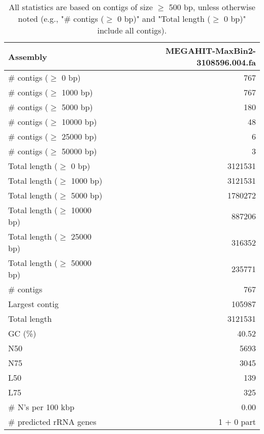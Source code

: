 \documentclass[12pt,a4paper]{article}
\begin{document}
\begin{table}[ht]
\begin{center}
\caption{All statistics are based on contigs of size $\geq$ 500 bp, unless otherwise noted (e.g., "\# contigs ($\geq$ 0 bp)" and "Total length ($\geq$ 0 bp)" include all contigs).}
\begin{tabular}{|l*{1}{|r}|}
\hline
Assembly & MEGAHIT-MaxBin2-3108596.004.fa \\ \hline
\# contigs ($\geq$ 0 bp) & 767 \\ \hline
\# contigs ($\geq$ 1000 bp) & 767 \\ \hline
\# contigs ($\geq$ 5000 bp) & 180 \\ \hline
\# contigs ($\geq$ 10000 bp) & 48 \\ \hline
\# contigs ($\geq$ 25000 bp) & 6 \\ \hline
\# contigs ($\geq$ 50000 bp) & 3 \\ \hline
Total length ($\geq$ 0 bp) & 3121531 \\ \hline
Total length ($\geq$ 1000 bp) & 3121531 \\ \hline
Total length ($\geq$ 5000 bp) & 1780272 \\ \hline
Total length ($\geq$ 10000 bp) & 887206 \\ \hline
Total length ($\geq$ 25000 bp) & 316352 \\ \hline
Total length ($\geq$ 50000 bp) & 235771 \\ \hline
\# contigs & 767 \\ \hline
Largest contig & 105987 \\ \hline
Total length & 3121531 \\ \hline
GC (\%) & 40.52 \\ \hline
N50 & 5693 \\ \hline
N75 & 3045 \\ \hline
L50 & 139 \\ \hline
L75 & 325 \\ \hline
\# N's per 100 kbp & 0.00 \\ \hline
\# predicted rRNA genes & 1 + 0 part \\ \hline
\end{tabular}
\end{center}
\end{table}
\end{document}
